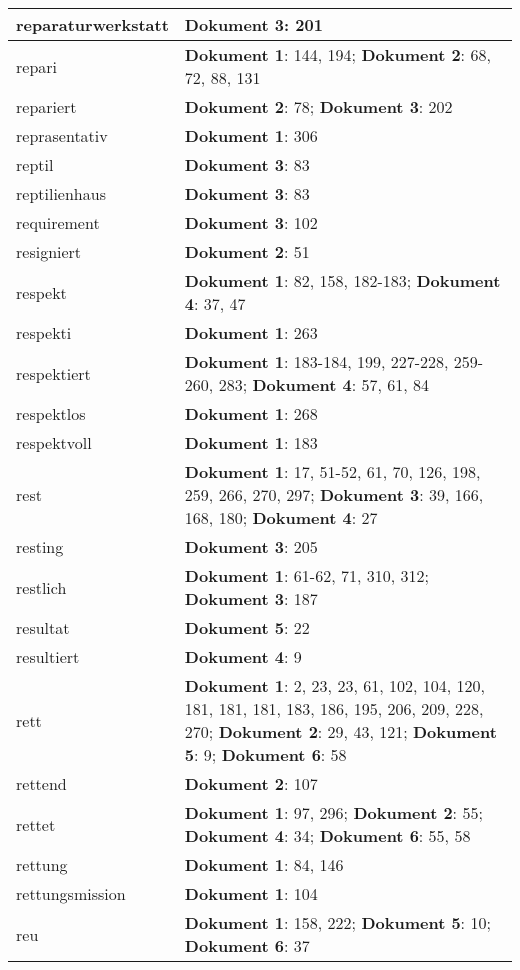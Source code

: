\documentclass[a5paper]{article}
\begin{document}
\begin{longtable}[l]{|l|p{3in}|}
\hline
reparaturwerkstatt & \textbf{Dokument 3}: 201 \\
\hline
repari & \textbf{Dokument 1}: 144, 194; \textbf{Dokument 2}: 68, 72, 88, 131 \\
\hline
repariert & \textbf{Dokument 2}: 78; \textbf{Dokument 3}: 202 \\
\hline
reprasentativ & \textbf{Dokument 1}: 306 \\
\hline
reptil & \textbf{Dokument 3}: 83 \\
\hline
reptilienhaus & \textbf{Dokument 3}: 83 \\
\hline
requirement & \textbf{Dokument 3}: 102 \\
\hline
resigniert & \textbf{Dokument 2}: 51 \\
\hline
respekt & \textbf{Dokument 1}: 82, 158, 182-183; \textbf{Dokument 4}: 37, 47 \\
\hline
respekti & \textbf{Dokument 1}: 263 \\
\hline
respektiert & \textbf{Dokument 1}: 183-184, 199, 227-228, 259-260, 283; \textbf{Dokument 4}: 57, 61, 84 \\
\hline
respektlos & \textbf{Dokument 1}: 268 \\
\hline
respektvoll & \textbf{Dokument 1}: 183 \\
\hline
rest & \textbf{Dokument 1}: 17, 51-52, 61, 70, 126, 198, 259, 266, 270, 297; \textbf{Dokument 3}: 39, 166, 168, 180; \textbf{Dokument 4}: 27 \\
\hline
resting & \textbf{Dokument 3}: 205 \\
\hline
restlich & \textbf{Dokument 1}: 61-62, 71, 310, 312; \textbf{Dokument 3}: 187 \\
\hline
resultat & \textbf{Dokument 5}: 22 \\
\hline
resultiert & \textbf{Dokument 4}: 9 \\
\hline
rett & \textbf{Dokument 1}: 2, 23, 23, 61, 102, 104, 120, 181, 181, 181, 183, 186, 195, 206, 209, 228, 270; \textbf{Dokument 2}: 29, 43, 121; \textbf{Dokument 5}: 9; \textbf{Dokument 6}: 58 \\
\hline
rettend & \textbf{Dokument 2}: 107 \\
\hline
rettet & \textbf{Dokument 1}: 97, 296; \textbf{Dokument 2}: 55; \textbf{Dokument 4}: 34; \textbf{Dokument 6}: 55, 58 \\
\hline
rettung & \textbf{Dokument 1}: 84, 146 \\
\hline
rettungsmission & \textbf{Dokument 1}: 104 \\
\hline
reu & \textbf{Dokument 1}: 158, 222; \textbf{Dokument 5}: 10; \textbf{Dokument 6}: 37 \\

\end{longtable}
\end{document}
